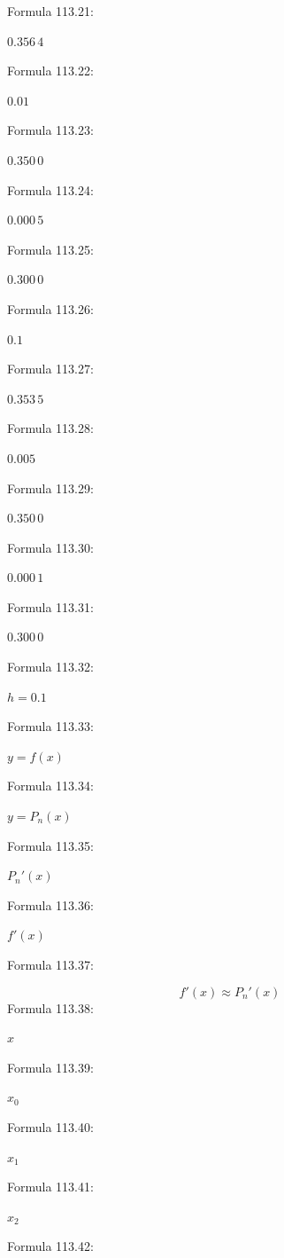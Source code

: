 \documentclass[11pt]{article}
\begin{document}
\noindent Formula 113.21:\par
$0.356\,4$\par
\noindent Formula 113.22:\par
$0.01$\par
\noindent Formula 113.23:\par
$0.350\,0$\par
\noindent Formula 113.24:\par
$0.000\,5$\par
\noindent Formula 113.25:\par
$0.300\,0$\par
\noindent Formula 113.26:\par
$0.1$\par
\noindent Formula 113.27:\par
$0.353\,5$\par
\noindent Formula 113.28:\par
$0.005$\par
\noindent Formula 113.29:\par
$0.350\,0$\par
\noindent Formula 113.30:\par
$0.000\,1$\par
\noindent Formula 113.31:\par
$0.300\,0$\par
\noindent Formula 113.32:\par
$h=0.1$\par
\noindent Formula 113.33:\par
$y=f(x)$\par
\noindent Formula 113.34:\par
$y=P_n(x)$\par
\noindent Formula 113.35:\par
$P_n'(x)$\par
\noindent Formula 113.36:\par
$f'(x)$\par
\noindent Formula 113.37:\par
\[
f'(x)\approx P_n'(x)
\tag{4.5.1}
\]
\noindent Formula 113.38:\par
$x$\par
\noindent Formula 113.39:\par
$x_0$\par
\noindent Formula 113.40:\par
$x_1$\par
\noindent Formula 113.41:\par
$x_2$\par
\noindent Formula 113.42:\par
\end{document}
